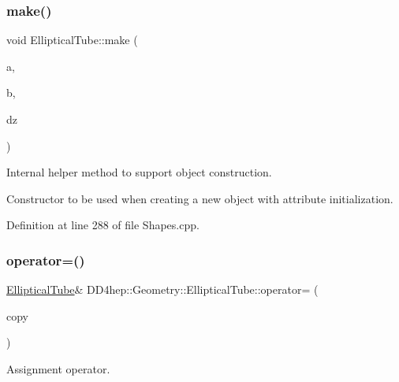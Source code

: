 \subsubsection{\texorpdfstring{make()}{make()}}
{\footnotesize\ttfamily void Elliptical\+Tube\+::make (\begin{DoxyParamCaption}\item[{double}]{a,  }\item[{double}]{b,  }\item[{double}]{dz }\end{DoxyParamCaption})\hspace{0.3cm}{\ttfamily [protected]}}



Internal helper method to support object construction. 

Constructor to be used when creating a new object with attribute initialization. 

Definition at line 288 of file Shapes.\+cpp.

\hypertarget{class_d_d4hep_1_1_geometry_1_1_elliptical_tube_a84ff0e55200252e49f28d9ca278b0b1f}{}\label{class_d_d4hep_1_1_geometry_1_1_elliptical_tube_a84ff0e55200252e49f28d9ca278b0b1f} 
\subsubsection{\texorpdfstring{operator=()}{operator=()}}
{\footnotesize\ttfamily \hyperlink{class_d_d4hep_1_1_geometry_1_1_elliptical_tube}{Elliptical\+Tube}\& D\+D4hep\+::\+Geometry\+::\+Elliptical\+Tube\+::operator= (\begin{DoxyParamCaption}\item[{const \hyperlink{class_d_d4hep_1_1_geometry_1_1_elliptical_tube}{Elliptical\+Tube} \&}]{copy }\end{DoxyParamCaption})\hspace{0.3cm}{\ttfamily [default]}}



Assignment operator. 

\hypertarget{class_d_d4hep_1_1_geometry_1_1_elliptical_tube_a65ee98dd3ac38b6158fa55443919c0f5}{}\label{class_d_d4hep_1_1_geometry_1_1_elliptical_tube_a65ee98dd3ac38b6158fa55443919c0f5} 
